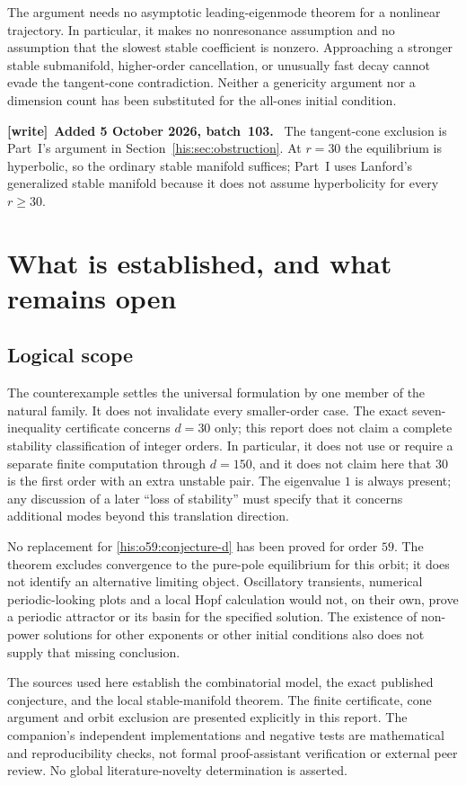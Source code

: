 \documentclass[11pt]{article}
\theoremstyle{remark}\newtheorem{remark}[theorem]{Remark}
\numberwithin{equation}{section}
\newenvironment{writenote}[1][]{\par\smallskip\begingroup\small
 \noindent\textbf{[write]}\if\relax\detokenize{#1}\relax\else~\textbf{#1.}\fi\ }%
 {\par\endgroup\smallskip}
\begin{document}
The argument needs no asymptotic leading-eigenmode theorem for a
nonlinear trajectory. In particular, it makes no nonresonance
assumption and no assumption that the slowest stable coefficient is
nonzero. Approaching a stronger stable submanifold, higher-order
cancellation, or unusually fast decay cannot evade the tangent-cone
contradiction. Neither a genericity argument nor a dimension count
has been substituted for the all-ones initial condition.
\begin{writenote}[Added 5 October 2026, batch~103]
The tangent-cone exclusion is Part~I's argument in Section~\ref{his:sec:obstruction}. At $r=30$ the equilibrium is hyperbolic, so the ordinary stable manifold suffices; Part~I uses Lanford's generalized stable manifold because it does not assume hyperbolicity for every $r\ge30$.
\end{writenote}


\section{What is established, and what remains open}\label{his:o59:sec:open}
\subsection{Logical scope}
The counterexample settles the universal formulation by one member of
the natural family. It does not invalidate every smaller-order case.
The exact seven-inequality certificate concerns $d=30$ only; this report
does not claim a complete stability classification of integer orders.
In particular, it does not use or require a separate finite computation
through $d=150$, and it does not claim here that $30$ is the first
order with an extra unstable pair. The eigenvalue $1$ is always
present; any discussion of a later ``loss of stability'' must specify
that it concerns additional modes beyond this translation direction.

No replacement for \eqref{his:o59:conjecture-d} has been proved for order $59$.
The theorem excludes convergence to the pure-pole equilibrium for this
orbit; it does not identify an alternative limiting object. Oscillatory
transients, numerical periodic-looking plots and a local Hopf
calculation would not, on their own, prove a periodic attractor or its
basin for the specified solution. The existence of non-power solutions
for other exponents or other initial conditions also does not supply
that missing conclusion.

The sources used here establish the combinatorial model, the exact
published conjecture, and the local stable-manifold theorem. The
finite certificate, cone argument and orbit exclusion are presented
explicitly in this report. The companion's independent implementations
and negative tests are mathematical and reproducibility checks, not
formal proof-assistant verification or external peer review. No global
literature-novelty determination is asserted.
\end{document}
